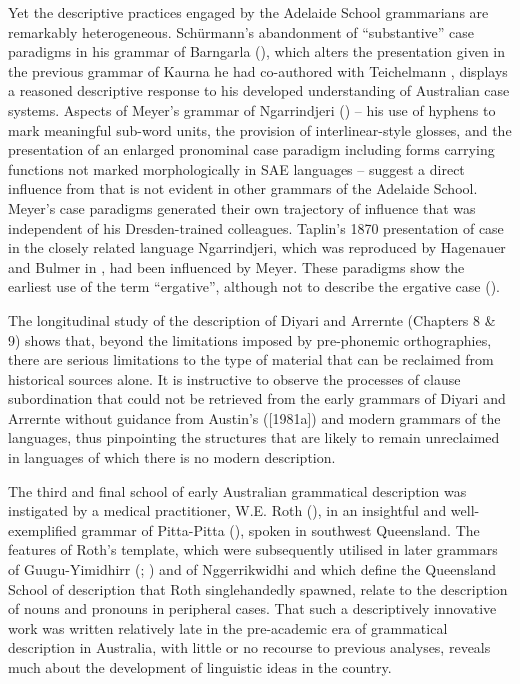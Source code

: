 Yet the descriptive practices engaged by the Adelaide School grammarians are remarkably heterogeneous. Schürmann’s abandonment of “substantive” case paradigms in his grammar of Barngarla (\citealt{schurmann_letter_1844}), which alters the presentation given in the previous grammar of Kaurna he had co-authored with Teichelmann \citep{teichelmann_outlines_1840}, displays a reasoned descriptive response to his developed understanding of Australian case systems. Aspects of Meyer’s grammar of Ngarrindjeri (\citealt{meyer_vocabulary_1843}) -- his use of hyphens to mark meaningful sub-word units, the provision of interlinear-style glosses, and the presentation of an enlarged pronominal case paradigm including forms carrying functions not marked morphologically in SAE languages -- suggest a direct influence from \citet{threlkeld_australian_1834} that is not evident in other grammars of the Adelaide School. Meyer’s case paradigms generated their own trajectory of influence that was independent of his Dresden-trained colleagues. Taplin’s 1870 presentation of case \citep[85]{taplin_notes_1872} in the closely related language Ngarrindjeri, which was reproduced by Hagenauer and Bulmer in \citet{thomas_succinct_1878}, had been influenced by Meyer. These paradigms show the earliest use of the term “ergative'', although not to describe the ergative case ().

The longitudinal study of the description of Diyari and Arrernte (Chapters 8 \& 9) shows that, beyond the limitations imposed by pre-phonemic orthographies, there are serious limitations to the type of material that can be reclaimed from historical sources alone. It is instructive to observe the processes of clause subordination that could not be retrieved from the early grammars of Diyari and Arrernte without guidance from Austin’s (\citeyear{austin_grammar_2013}[1981a]) and  modern grammars of the languages, thus pinpointing the structures that are likely to remain unreclaimed in languages of which there is no modern description.

The third and final school of early Australian grammatical description was instigated by a medical practitioner, W.E. Roth (), in an insightful and well-exemplified grammar of Pitta-Pitta (\citeyear{roth_ethnological_1897}), spoken in southwest Queensland. The features of Roth’s template, which were subsequently utilised in later grammars of Guugu-Yimidhirr (\citealt{schwarz_koko_1900}; \citealt{roth_structure_1901}) and of Nggerrikwidhi \citep{hey_elementary_1903} and which define the Queensland School of description that Roth singlehandedly spawned, relate to the description of nouns and pronouns in peripheral cases. That such a descriptively innovative work was written relatively late in the pre-academic era of grammatical description in Australia, with little or no recourse to previous analyses, reveals much about the development of linguistic ideas in the country.


